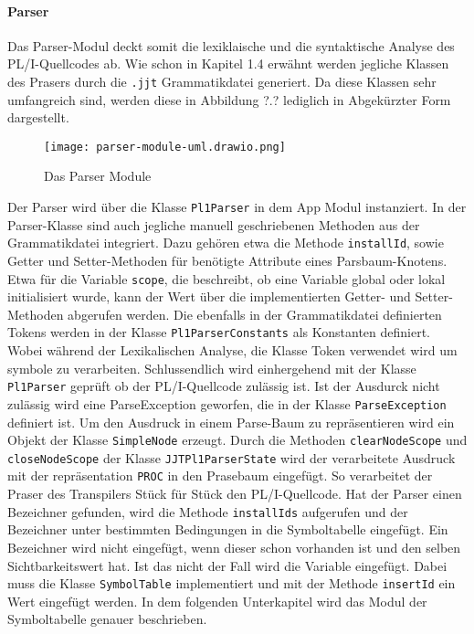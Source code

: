 \paragraph{Parser}
Das Parser-Modul deckt somit die lexiklaische und die syntaktische Analyse des PL/I-Quellcodes ab.
Wie schon in Kapitel 1.4 erwähnt werden jegliche Klassen des Prasers durch die \verb+.jjt+ Grammatikdatei 
generiert. Da diese Klassen sehr umfangreich sind, werden diese in Abbildung ?.? lediglich in Abgekürzter Form dargestellt. 

\begin{figure}[h]
	\centering
	\caption{Das Parser Module}
	\texttt{[image: parser-module-uml.drawio.png]}
	\label{fig:Parser Module}
\end{figure}

Der Parser wird über die Klasse \verb+Pl1Parser+ in dem App Modul instanziert. In der Parser-Klasse sind auch jegliche manuell geschriebenen Methoden aus der Grammatikdatei integriert. 
Dazu gehören etwa die Methode \verb+installId+, sowie Getter und Setter-Methoden für benötigte Attribute eines Parsbaum-Knotens. 
Etwa für die Variable \verb+scope+, die beschreibt, ob eine Variable global oder lokal initialisiert wurde, kann der Wert über die implementierten Getter- und Setter-Methoden abgerufen werden.
Die ebenfalls in der Grammatikdatei definierten Tokens werden in der Klasse \verb+Pl1ParserConstants+ als Konstanten definiert. Wobei während der Lexikalischen Analyse, die Klasse Token verwendet wird um symbole zu verarbeiten. 
Schlussendlich wird einhergehend mit der Klasse \verb+Pl1Parser+ geprüft ob der PL/I-Quellcode zulässig ist. 
Ist der Ausdurck nicht zulässig wird eine ParseException geworfen, die in der Klasse \verb+ParseException+ definiert ist.
Um den Ausdruck in einem Parse-Baum zu repräsentieren wird ein Objekt der Klasse \verb+SimpleNode+ erzeugt. Durch die Methoden \verb+clearNodeScope+ und \verb+closeNodeScope+ der Klasse \verb+JJTPl1ParserState+ wird der verarbeitete Ausdruck mit der repräsentation \verb+PROC+ in den Prasebaum eingefügt. 
So verarbeitet der Praser des Transpilers Stück für Stück den PL/I-Quellcode. Hat der Parser einen Bezeichner gefunden, wird die Methode \verb+installIds+ aufgerufen und der Bezeichner unter bestimmten Bedingungen in die Symboltabelle eingefügt. 
Ein Bezeichner wird nicht eingefügt, 
wenn dieser schon vorhanden ist und den selben Sichtbarkeitswert hat. Ist das nicht der Fall wird die Variable eingefügt.
Dabei muss die Klasse \verb+SymbolTable+ implementiert und mit der Methode \verb+insertId+ ein Wert eingefügt werden. In dem folgenden Unterkapitel wird das Modul der Symboltabelle genauer beschrieben. 


